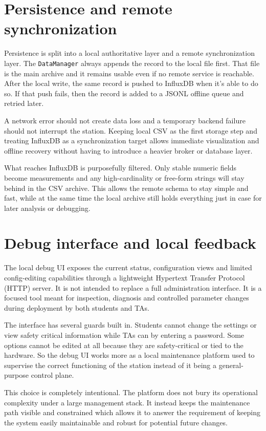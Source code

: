 \section{Persistence and remote synchronization}

Persistence is split into a local authoritative layer and a remote synchronization layer. The \texttt{DataManager} always appends the record to the local file first. That file is the main archive and it remains usable even if no remote service is reachable. After the local write, the same record is pushed to InfluxDB when it's able to do so. If that push fails, then the record is added to a JSONL offline queue and retried later.

A network error should not create data loss and a temporary backend failure should not interrupt the station. Keeping local CSV as the first storage step and treating InfluxDB as a synchronization target allows immediate visualization and offline recovery without having to introduce a heavier broker or database layer.

What reaches InfluxDB is purposefully filtered. Only stable numeric fields become measurements and any high-cardinality or free-form strings will stay behind in the CSV archive. This allows the remote schema to stay simple and fast, while at the same time the local archive still holds everything just in case for later analysis or debugging.

\section{Debug interface and local feedback}

The local debug UI exposes the current status, configuration views and limited config-editing capabilities through a lightweight Hypertext Transfer Protocol (HTTP) server. It is not intended to replace a full administration interface. It is a focused tool meant for inspection, diagnosis and controlled parameter changes during deployment by both students and TAs.

The interface has several guards built in. Students cannot change the settings or view safety critical information while TAs can by entering a password. Some options cannot be edited at all because they are safety-critical or tied to the hardware. So the debug UI works more as a local maintenance platform used to supervise the correct functioning of the station instead of it being a general-purpose control plane.

This choice is completely intentional. The platform does not bury its operational complexity under a large management stack. It instead keeps the maintenance path visible and constrained which allows it to answer the requirement of keeping the system easily maintainable and robust for potential future changes.

